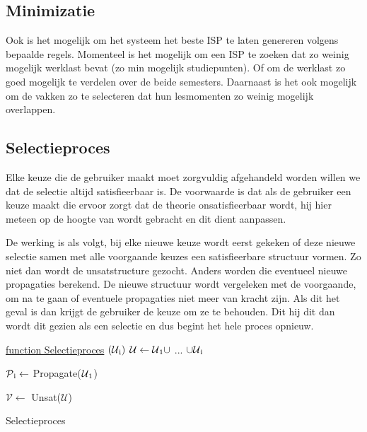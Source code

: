\subsection{Minimizatie}
Ook is het mogelijk om het systeem het beste ISP te laten genereren volgens bepaalde regels. Momenteel is het mogelijk om een ISP te zoeken dat zo weinig mogelijk werklast bevat (zo min mogelijk studiepunten). Of om de werklast zo goed mogelijk te verdelen over de beide semesters. 
Daarnaast is het ook mogelijk om de vakken zo te selecteren dat hun lesmomenten zo weinig mogelijk overlappen. 

\subsection{Selectieproces}
Elke keuze die de gebruiker maakt moet zorgvuldig afgehandeld worden willen we dat de selectie altijd satisfieerbaar is. De voorwaarde is dat als de gebruiker een keuze maakt die ervoor zorgt dat de theorie onsatisfieerbaar wordt, hij hier meteen op de hoogte van wordt gebracht en dit dient aanpassen. 

De werking is als volgt, bij elke nieuwe keuze wordt eerst gekeken of deze nieuwe selectie samen met alle voorgaande keuzes een satisfieerbare structuur vormen. Zo niet dan wordt de unsatstructure gezocht. Anders worden die eventueel nieuwe propagaties berekend. De nieuwe structuur wordt vergeleken met de voorgaande, om na te gaan of eventuele propagaties niet meer van kracht zijn. Als dit het geval is dan krijgt de gebruiker de keuze om ze te behouden. Dit hij dit dan wordt dit gezien als een selectie en dus begint het hele proces opnieuw. 

\begin{algorithm}
	\underline{function Selectieproces} $(\mathcal{U}\textsubscript{i})$ \;
	$\mathcal{U} \leftarrow \mathcal{U}\textsubscript{1}  \cup$ ... $\cup  \mathcal{U}\textsubscript{i}$\;
		{
		$\mathcal{P}\textsubscript{i} \leftarrow$ Propagate($\mathcal{U}\textsubscript{1}$)\;
		
		}
		{
		$\mathcal{V} \leftarrow$ Unsat($\mathcal{U}$)\; 
		}
	\caption{Selectieproces}
\end{algorithm}

